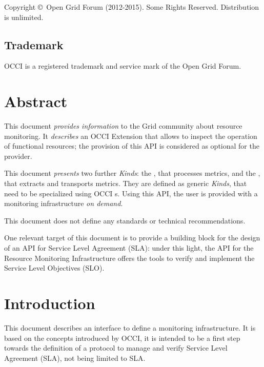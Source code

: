 \documentclass[12pt]{article}  %
\newcommand{\copyrightyears}{2012-2015}  %
\begin{document}
Copyright \copyright \ Open Grid Forum (\copyrightyears).  Some Rights Reserved.  
Distribution is unlimited.

\subsection*{Trademark}

OCCI is a registered trademark and service mark of the Open Grid Forum. 

\section*{Abstract}

This document {\em provides information} to the Grid community about resource monitoring. It {\em describes} an OCCI Extension that allows to inspect the operation of functional resources; the provision of this API is considered as optional for the provider.

This document {\em presents} two further {\em Kinds}: the \sens, that processes metrics, and the \coll, that extracts and transports metrics. They are defined as generic {\em Kinds}, that need to be specialized using OCCI \mi s. Using this API, the user is provided with a monitoring infrastructure {\em on demand}.

This document does not define any standards or technical recommendations.

One relevant target of this document is to provide a building block for the design of an API for Service Level Agreement (SLA): under this light, the API for the Resource Monitoring Infrastructure offers the tools to verify and implement the Service Level Objectives (SLO).

\tableofcontents

\newpage

\section{Introduction}

This document describes an interface to define a monitoring infrastructure. It is based on the concepts introduced by OCCI, it is intended to be a first step towards the definition of a protocol to manage and verify Service Level Agreement (SLA), not being limited to SLA.
\end{document}
